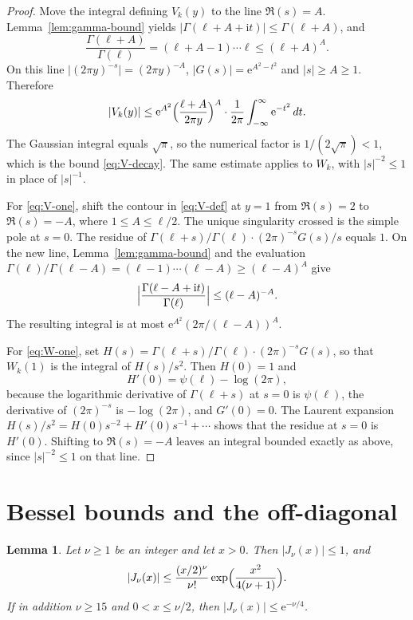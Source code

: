 \documentclass[11pt]{amsart}
\newtheorem{lemma}[theorem]{Lemma}
\theoremstyle{definition}
\theoremstyle{remark}
\numberwithin{equation}{section}
\newcommand{\ee}{\mathrm{e}}
\newcommand{\ii}{\mathrm{i}}
\begin{document}
\begin{proof}
Move the integral defining $V_k(y)$ to the line $\Re(s)=A$. Lemma~\ref{lem:gamma-bound} yields $\lvert\Gamma(\ell+A+\ii t)\rvert\le\Gamma(\ell+A)$, and
\[
\frac{\Gamma(\ell+A)}{\Gamma(\ell)}=(\ell+A-1)\cdots\ell\le(\ell+A)^A.
\]
On this line $\lvert(2\pi y)^{-s}\rvert=(2\pi y)^{-A}$, $\lvert G(s)\rvert=\ee^{A^2-t^2}$ and $\lvert s\rvert\ge A\ge 1$. Therefore
\[
\lvert V_k(y)\rvert
\le\ee^{A^2}\Bigl(\frac{\ell+A}{2\pi y}\Bigr)^A\cdot\frac{1}{2\pi}\int_{-\infty}^\infty\ee^{-t^2}\,dt.
\]
The Gaussian integral equals $\sqrt\pi$, so the numerical factor is $1/(2\sqrt\pi)<1$, which is the bound \eqref{eq:V-decay}. The same estimate applies to $W_k$, with $\lvert s\rvert^{-2}\le 1$ in place of $\lvert s\rvert^{-1}$.

For \eqref{eq:V-one}, shift the contour in \eqref{eq:V-def} at $y=1$ from $\Re(s)=2$ to $\Re(s)=-A$, where $1\le A\le\ell/2$. The unique singularity crossed is the simple pole at $s=0$. The residue of $\Gamma(\ell+s)/\Gamma(\ell)\cdot(2\pi)^{-s}G(s)/s$ equals $1$. On the new line, Lemma~\ref{lem:gamma-bound} and the evaluation $\Gamma(\ell)/\Gamma(\ell-A)=(\ell-1)\cdots(\ell-A)\ge(\ell-A)^A$ give
\[
\Bigl\lvert\frac{\Gamma(\ell-A+\ii t)}{\Gamma(\ell)}\Bigr\rvert
\le(\ell-A)^{-A}.
\]
The resulting integral is at most $\ee^{A^2}(2\pi/(\ell-A))^A$.

For \eqref{eq:W-one}, set $H(s)=\Gamma(\ell+s)/\Gamma(\ell)\cdot(2\pi)^{-s}G(s)$, so that $W_k(1)$ is the integral of $H(s)/s^2$. Then $H(0)=1$ and
\[
H'(0)=\psi(\ell)-\log(2\pi),
\]
because the logarithmic derivative of $\Gamma(\ell+s)$ at $s=0$ is $\psi(\ell)$, the derivative of $(2\pi)^{-s}$ is $-\log(2\pi)$, and $G'(0)=0$. The Laurent expansion $H(s)/s^2=H(0)s^{-2}+H'(0)s^{-1}+\cdots$ shows that the residue at $s=0$ is $H'(0)$. Shifting to $\Re(s)=-A$ leaves an integral bounded exactly as above, since $\lvert s\rvert^{-2}\le 1$ on that line.
\end{proof}

\section{Bessel bounds and the off-diagonal}
\label{sec:bessel}

\begin{lemma}\label{lem:bessel-small}
Let $\nu\ge 1$ be an integer and let $x>0$. Then $\lvert J_\nu(x)\rvert\le 1$, and
\begin{equation}\label{eq:bessel-series-bound}
\lvert J_\nu(x)\rvert
\le\frac{(x/2)^\nu}{\nu!}\exp\Bigl(\frac{x^2}{4(\nu+1)}\Bigr).
\end{equation}
If in addition $\nu\ge 15$ and $0<x\le\nu/2$, then $\lvert J_\nu(x)\rvert\le\ee^{-\nu/4}$.
\end{lemma}
\end{document}

